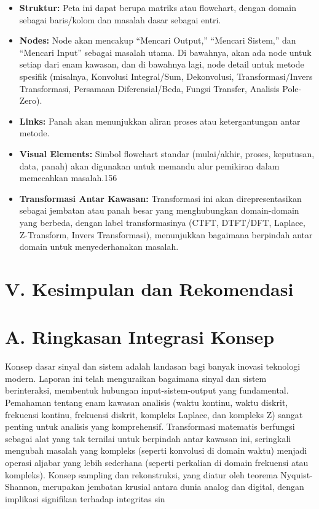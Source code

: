 \documentclass[
  letterpaper,
  DIV=11,
  numbers=noendperiod]{scrreprt}
\begin{document}
\begin{itemize}
\item
  \textbf{Struktur:} Peta ini dapat berupa matriks atau flowchart,
  dengan domain sebagai baris/kolom dan masalah dasar sebagai entri.
\item
  \textbf{Nodes:} Node akan mencakup ``Mencari Output,'' ``Mencari
  Sistem,'' dan ``Mencari Input'' sebagai masalah utama. Di bawahnya,
  akan ada node untuk setiap dari enam kawasan, dan di bawahnya lagi,
  node detail untuk metode spesifik (misalnya, Konvolusi Integral/Sum,
  Dekonvolusi, Transformasi/Invers Transformasi, Persamaan
  Diferensial/Beda, Fungsi Transfer, Analisis Pole-Zero).
\item
  \textbf{Links:} Panah akan menunjukkan aliran proses atau
  ketergantungan antar metode.
\item
  \textbf{Visual Elements:} Simbol flowchart standar (mulai/akhir,
  proses, keputusan, data, panah) akan digunakan untuk memandu alur
  pemikiran dalam memecahkan masalah.156
\item
  \textbf{Transformasi Antar Kawasan:} Transformasi ini akan
  direpresentasikan sebagai jembatan atau panah besar yang menghubungkan
  domain-domain yang berbeda, dengan label transformasinya (CTFT,
  DTFT/DFT, Laplace, Z-Transform, Invers Transformasi), menunjukkan
  bagaimana berpindah antar domain untuk menyederhanakan masalah.
\end{itemize}

\section{V. Kesimpulan dan
Rekomendasi}\label{v.-kesimpulan-dan-rekomendasi}

\section{A. Ringkasan Integrasi
Konsep}\label{a.-ringkasan-integrasi-konsep}

Konsep dasar sinyal dan sistem adalah landasan bagi banyak inovasi
teknologi modern. Laporan ini telah menguraikan bagaimana sinyal dan
sistem berinteraksi, membentuk hubungan input-sistem-output yang
fundamental. Pemahaman tentang enam kawasan analisis (waktu kontinu,
waktu diskrit, frekuensi kontinu, frekuensi diskrit, kompleks Laplace,
dan kompleks Z) sangat penting untuk analisis yang komprehensif.
Transformasi matematis berfungsi sebagai alat yang tak ternilai untuk
berpindah antar kawasan ini, seringkali mengubah masalah yang kompleks
(seperti konvolusi di domain waktu) menjadi operasi aljabar yang lebih
sederhana (seperti perkalian di domain frekuensi atau kompleks). Konsep
sampling dan rekonstruksi, yang diatur oleh teorema Nyquist-Shannon,
merupakan jembatan krusial antara dunia analog dan digital, dengan
implikasi signifikan terhadap integritas sin
\end{document}
